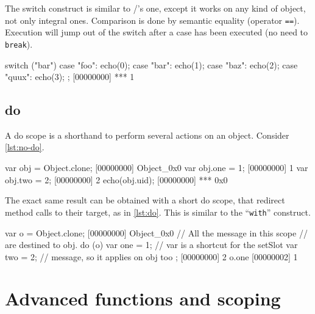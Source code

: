 \documentclass[openright,twoside,12pt]{report}
\begin{document}
The switch construct is similar to \C/\Cxx's one, except it works on
any kind of object, not only integral ones. Comparison is done by
semantic equality (operator \texttt{==}). Execution will jump out of
the switch after a case has been executed (no need to \texttt{break}).

\begin{urbiscript}[caption=The \texttt{switch} construct,
label=switch]
switch ("bar")
{
  case "foo":
    echo(0);
  case "bar":
    echo(1);
  case "baz":
    echo(2);
  case "quux":
    echo(3);
};
[00000000] *** 1
\end{urbiscript}

\section{do}
\label{section:constructs/do}

A do scope is a shorthand to perform several actions on an
object. Consider \autoref{lst:no-do}.

\begin{urbiscript}[caption=Lot of code bloat,label=lst:no-do]
var obj = Object.clone;
[00000000] Object_0x0
var obj.one = 1;
[00000000] 1
var obj.two = 2;
[00000000] 2
echo(obj.uid);
[00000000] *** 0x0
\end{urbiscript}

The exact same result can be obtained with a short do scope, that
redirect method calls to their target, as in \autoref{lst:do}. This is similar
to the \pascal ``\texttt{with}'' construct.


\begin{urbiscript}[caption=Shorter with a do block,label=lst:do]
var o = Object.clone;
[00000000] Object_0x0
// All the message in this scope
// are destined to obj.
do (o)
{
 var one = 1; // var is a shortcut for the setSlot
 var two = 2; // message, so it applies on obj too
};
[00000000] 2
o.one
[00000002] 1
\end{urbiscript}



\chapter{Advanced functions and scoping}
\end{document}
